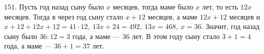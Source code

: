 151. Пусть год назад сыну было $x$ месяцев, тогда маме было $x$ лет, то есть $12x$ месяцев. Тогда в через год сыну стало $x+12$ месяцев, а маме $12x+12$ месяцев
и $x+12+12x+12=41\cdot12,\ 13x+24=492,\ 13x=468,\ x=36.$ Значит, год назад сыну было $36:12=3$ года, а маме --- 36 лет. В этом году сыну стало $3+1=4$ года, а маме --- $36+1=37$ лет.\\
